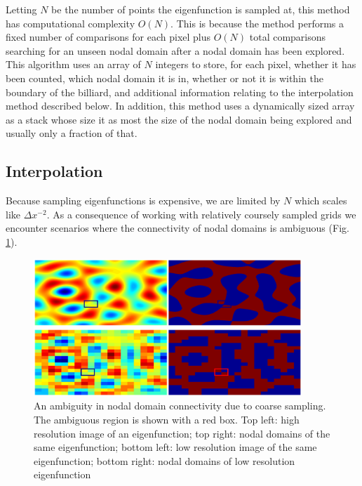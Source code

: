 \documentclass{article}
\begin{document}
Letting $N$ be the number of points the eigenfunction is sampled at, this method has computational complexity $O(N)$. This is because the method performs a fixed number of comparisons for each pixel plus $O(N)$ total comparisons searching for an unseen nodal domain after a nodal domain has been explored. This algorithm uses an array of $N$ integers to store, for each pixel, whether it has been counted, which nodal domain it is in, whether or not it is within the boundary of the billiard, and additional information relating to the interpolation method described below. In addition, this method uses a dynamically sized array as a stack whose size it as most the size of the nodal domain being explored and usually only a fraction of that.

\subsection*{Interpolation}
Because sampling eigenfunctions is expensive, we are limited by $N$ which scales like $\Delta x ^{-2}$. As a consequence of working with relatively coursely sampled grids we encounter scenarios where the connectivity of nodal domains is ambiguous (Fig. \ref{fig:interpolation_sample}).

\begin{figure}[h!]
  \begin{center}
    \includegraphics[width=0.9\textwidth]{figs/interpolation_sample.eps}
    \caption{An ambiguity in nodal domain connectivity due to coarse sampling. The ambiguous region is shown with a red box. Top left: high resolution image of an eigenfunction; top right: nodal domains of the same eigenfunction; bottom left: low resolution image of the same eigenfunction; bottom right: nodal domains of low resolution eigenfunction}
    \label{fig:interpolation_sample}
  \end{center}
\end{figure}
\end{document}
